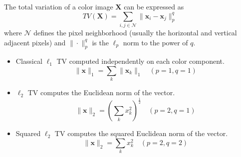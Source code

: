 \documentclass[12pt,twoside]{article}
\begin{document}
The total variation of a color image \(\mathbf{X}\) can be expressed as
\[
TV(\mathbf{X}) = \sum_{i,j \in \mathcal{N}} \|\mathbf{x}_i - \mathbf{x}_j\|_p^q
\]
where \(\mathcal{N}\) defines the pixel neighborhood (usually the horizontal and vertical adjacent pixels) and \(\|\cdot\|_p^q\) is the \(\ell_p\) norm to the power of \(q\).

\begin{itemize}
    \item Classical \(\ell_1\) TV computed independently on each color component.
    \[
    \|\mathbf{x}\|_1 = \sum_k \|\mathbf{x}_k\|_1 \quad (p = 1, q = 1)
    \]

    \item \(\ell_2\) TV computes the Euclidean norm of the vector.
    \[
    \|\mathbf{x}\|_2 = \left( \sum_k x_k^2 \right)^{\frac{1}{2}} \quad (p = 2, q = 1)
    \]

    \item Squared \(\ell_2\) TV computes the squared Euclidean norm of the vector.
    \[
    \|\mathbf{x}\|_2 = \sum_k x_k^2 \quad (p = 2, q = 2)
    \]
\end{itemize}
\end{document}
